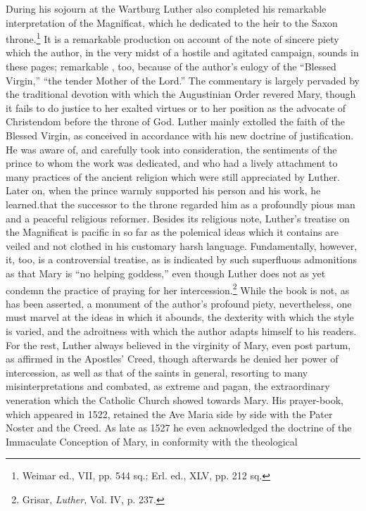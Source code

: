 During his sojourn at the Wartburg Luther also completed his
remarkable interpretation of the Magnificat, which he dedicated to
the heir to the Saxon throne.\footnote{Weimar ed., VII, pp. 544 sq.; Erl. ed., XLV, pp. 212 sq.}
It is a remarkable production on account
of the note of sincere piety which the author, in the very
midst of a hostile and agitated campaign, sounds in these pages; remarkable
, too, because of the author’s eulogy of the “Blessed Virgin,”
“the tender Mother of the Lord.” The commentary is largely
pervaded by the traditional devotion with which the Augustinian Order revered
Mary, though it fails to do justice to her exalted virtues
or to her position as the advocate of Christendom before the throne
of God. Luther mainly extolled the faith of the Blessed Virgin,
as conceived in accordance with his new doctrine of justification.
He was aware of, and carefully took into consideration, the sentiments
of the prince to whom the work was dedicated, and who had a lively
attachment to many practices of the ancient religion which were still
appreciated by Luther. Later on, when the prince warmly supported
his person and his work, he learned.that the successor to the throne
regarded him as a profoundly pious man and a peaceful religious reformer.
Besides its religious note, Luther’s treatise on the Magnificat is
pacific in so far as the polemical ideas which it contains are veiled and
not clothed in his customary harsh language. Fundamentally, however,
it, too, is a controversial treatise, as is indicated by such superfluous admonitions
as that Mary is “no helping goddess,” even though Luther
does not as yet condemn the practice of praying for her intercession.\footnote
{Grisar, \textit{Luther}, Vol. IV, p. 237.}
While the book is not, as has been asserted, a monument of the
author’s profound piety, nevertheless, one must marvel at the ideas in
which it abounds, the dexterity with which the style is varied, and the
adroitness with which the author adapts himself to his readers. For
the rest, Luther always believed in the virginity of Mary, even post
partum, as affirmed in the Apostles’ Creed, though afterwards he
denied her power of intercession, as well as that of the saints in general,
resorting to many misinterpretations and combated, as extreme
and pagan, the extraordinary veneration which the Catholic Church
showed towards Mary. His prayer-book, which appeared in 1522, retained
the Ave Maria side by side with the Pater Noster and the
Creed. As late as 1527 he even acknowledged the doctrine of the Immaculate
Conception of Mary, in conformity with the theological
